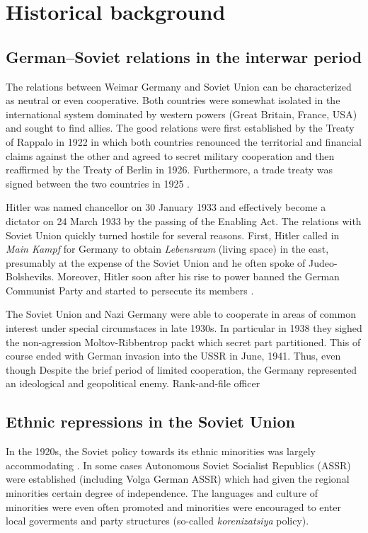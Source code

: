 \documentclass[11pt]{article}
\begin{document}
\section{Historical background}
\subsection{German–Soviet relations in the interwar period}
The relations between Weimar Germany and Soviet Union can be characterized as neutral or even cooperative. Both countries were somewhat isolated in the international system dominated by western powers (Great Britain, France, USA) and sought to find allies. The good relations were first established by the Treaty of Rappalo in 1922 in which both countries renounced the territorial and financial claims against the other and agreed to secret military cooperation \citep{gatzke_russo-german_1958} and then reaffirmed by the Treaty of Berlin in 1926. Furthermore, a trade treaty was signed between the two countries in 1925 \citep{morgan_political_1963}.

Hitler was named chancellor on 30 January 1933 and effectively become a dictator on 24 March 1933 by the passing of the Enabling Act. 
The relations with Soviet Union quickly turned hostile for several reasons.  First, Hitler called in \emph{Main Kampf} for Germany to obtain \emph{Lebensraum} (living space) in the east, presumably at the expense of the Soviet Union and he often spoke of Judeo-Bolsheviks. Moreover, Hitler soon after his rise to power banned the German Communist Party and started to persecute its members  \citep{haslam_soviet_1984}. 

The Soviet Union and Nazi Germany were able to cooperate in areas of common interest under special circumstaces in late 1930s. In particular in 1938 they sighed the non-agression Moltov-Ribbentrop packt which secret part partitioned. This of course ended with German invasion into the USSR in June, 1941. Thus, even though 
Despite the brief period of limited cooperation, the Germany represented an ideological and geopolitical enemy. Rank-and-file officer
\subsection{Ethnic repressions in the Soviet Union}
In the 1920s, the Soviet policy towards its ethnic minorities was largely accommodating \citep{martin_affirmative_2001}. In some cases Autonomous Soviet Socialist Republics (ASSR) were established (including Volga German ASSR) which had given the regional minorities certain degree of independence. The languages and culture of minorities were even often promoted and minorities were encouraged to enter local goverments and party structures (so-called \emph{korenizatsiya} policy). 
\end{document}
